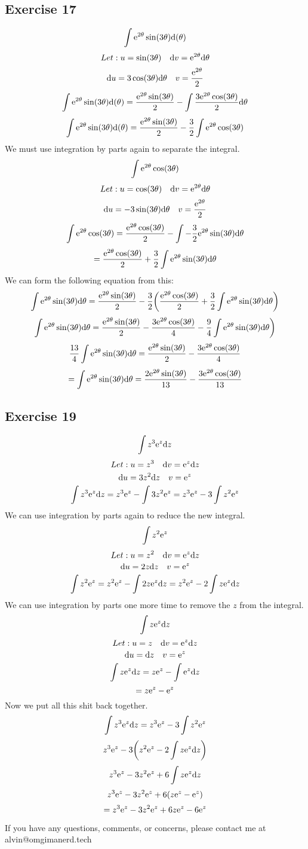 \documentclass{math}
\begin{document}
\subsection*{Exercise 17}
\[ \int{\mathrm{e}^{2\theta}\sin(3\theta)}\mathrm{d}(\theta) \]
\[ Let: u = \sin(3\theta) \quad \mathrm{d}{v} = \mathrm{e}^{2\theta}\mathrm{d}{\theta} \]
\[ \mathrm{d}{u} = 3\cos(3\theta)\mathrm{d}{\theta} \quad v = \frac{\mathrm{e}^{2\theta}}{2} \]
\[ \int{\mathrm{e}^{2\theta}\sin(3\theta)}\mathrm{d}(\theta) =
   \frac{\mathrm{e}^{2\theta}\sin(3\theta)}{2}-
   \int{\frac{3\mathrm{e}^{2\theta}\cos(3\theta)}{2}\mathrm{d}{\theta}} \]
\[ \int{\mathrm{e}^{2\theta}\sin(3\theta)}\mathrm{d}(\theta) =
   \frac{\mathrm{e}^{2\theta}\sin(3\theta)}{2}-
   \frac{3}{2}\int{\mathrm{e}^{2\theta}\cos(3\theta)} \]
We must use integration by parts again to separate the integral.
\[ \int{\mathrm{e}^{2\theta}\cos(3\theta)} \]
\[ Let: u = \cos(3\theta) \quad \mathrm{d}{v} = \mathrm{e}^{2\theta}\mathrm{d}{\theta} \]
\[ \mathrm{d}{u} = -3\sin(3\theta)\mathrm{d}{\theta} \quad v = \frac{\mathrm{e}^{2\theta}}{2} \]
\[ \int{\mathrm{e}^{2\theta}\cos(3\theta)} =
   \frac{\mathrm{e}^{2\theta}\cos(3\theta)}{2}-
   \int{-\frac{3}{2}\mathrm{e}^{2\theta}\sin(3\theta)\mathrm{d}{\theta}} \]
\[ = \frac{\mathrm{e}^{2\theta}\cos(3\theta)}{2}+\frac{3}{2}
   \int{\mathrm{e}^{2\theta}\sin(3\theta)\mathrm{d}{\theta}} \]
We can form the following equation from this:
\[ \int{\mathrm{e}^{2\theta}\sin(3\theta)\mathrm{d}{\theta}} =
   \frac{\mathrm{e}^{2\theta}\sin(3\theta)}{2}-
   \frac{3}{2}\bigg(\frac{\mathrm{e}^{2\theta}\cos(3\theta)}{2}+
   \frac{3}{2}\int{\mathrm{e}^{2\theta}\sin(3\theta)\mathrm{d}{\theta}}\bigg) \]
\[ \int{\mathrm{e}^{2\theta}\sin(3\theta)\mathrm{d}{\theta}} =
   \frac{\mathrm{e}^{2\theta}\sin(3\theta)}{2}-
   \frac{3\mathrm{e}^{2\theta}\cos(3\theta)}{4}-
   \frac{9}{4}\int{\mathrm{e}^{2\theta}\sin(3\theta)\mathrm{d}{\theta}}\bigg) \]
\[ \frac{13}{4}\int{\mathrm{e}^{2\theta}\sin(3\theta)\mathrm{d}{\theta}} =
   \frac{\mathrm{e}^{2\theta}\sin(3\theta)}{2}-
   \frac{3\mathrm{e}^{2\theta}\cos(3\theta)}{4} \]
\[ = \int{\mathrm{e}^{2\theta}\sin(3\theta)\mathrm{d}{\theta}} =
\frac{2\mathrm{e}^{2\theta}\sin(3\theta)}{13}-
\frac{3\mathrm{e}^{2\theta}\cos(3\theta)}{13} \]

\subsection*{Exercise 19}
\[ \int{z^{3}\mathrm{e}^{z}\mathrm{d}{z}} \]
\[ Let: u = z^{3} \quad \mathrm{d}{v} = \mathrm{e}^{z}\mathrm{d}{z} \]
\[ \mathrm{d}{u} = 3z^{2}\mathrm{d}{z} \quad v = \mathrm{e}^{z} \]
\[ \int{z^{3}\mathrm{e}^{z}\mathrm{d}{z}} =
   z^{3}\mathrm{e}^{z}-\int{3z^{2}\mathrm{e}^{z}} =
   z^{3}\mathrm{e}^{z}-3\int{z^{2}\mathrm{e}^{z}} \]
We can use integration by parts again to reduce the new integral.
\[ \int{z^{2}\mathrm{e}^{z}} \]
\[ Let: u = z^{2} \quad \mathrm{d}{v} = \mathrm{e}^{z}\mathrm{d}{z} \]
\[ \mathrm{d}{u} = 2z\mathrm{d}{z} \quad v = \mathrm{e}^{z} \]
\[ \int{z^{2}\mathrm{e}^{z}} = z^{2}\mathrm{e}^{z}-\int{2z\mathrm{e}^{z}\mathrm{d}{z}} =
   z^{2}\mathrm{e}^{z}-2\int{z\mathrm{e}^{z}\mathrm{d}{z}} \]
We can use integration by parts one more time to remove the \( z \) from the
integral.
\[ \int{z\mathrm{e}^{z}\mathrm{d}{z}} \]
\[ Let: u = z \quad \mathrm{d}{v} = \mathrm{e}^{z}\mathrm{d}{z} \]
\[ \mathrm{d}{u} = \mathrm{d}{z} \quad v = \mathrm{e}^{z} \]
\[ \int{z\mathrm{e}^{z}\mathrm{d}{z}} = z\mathrm{e}^{z}-\int{\mathrm{e}^{z}\mathrm{d}{z}} \]
\[ = z\mathrm{e}^{z}-\mathrm{e}^{z} \]
Now we put all this shit back together.
\[ \int{z^{3}\mathrm{e}^{z}\mathrm{d}{z}} =
   z^{3}\mathrm{e}^{z}-3\int{z^{2}\mathrm{e}^{z}} \]
\[ z^{3}\mathrm{e}^{z}-3\bigg(z^{2}\mathrm{e}^{z}-2\int{z\mathrm{e}^{z}\mathrm{d}{z}}\bigg) \]
\[ z^{3}\mathrm{e}^{z}-3z^{2}\mathrm{e}^{z}+6\int{z\mathrm{e}^{z}\mathrm{d}{z}} \]
\[ z^{3}\mathrm{e}^{z}-3z^{2}\mathrm{e}^{z}+6(z\mathrm{e}^{z}-\mathrm{e}^{z}) \]
\[ = z^{3}\mathrm{e}^{z}-3z^{2}\mathrm{e}^{z}+6z\mathrm{e}^{z}-6\mathrm{e}^{z} \]

\begin{center}
  If you have any questions, comments, or concerns, please contact me at
  alvin@omgimanerd.tech
\end{center}
\end{document}
